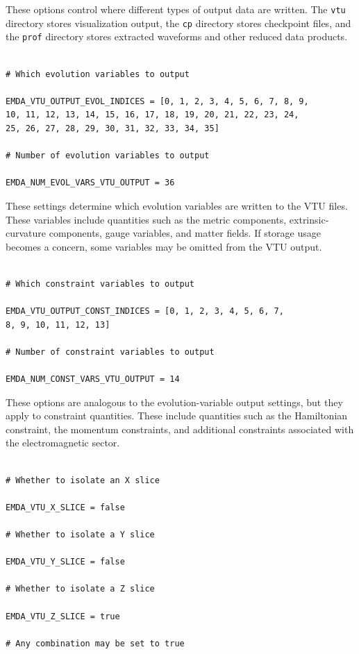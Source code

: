 These options control where different types of output data are written. The
\texttt{vtu} directory stores visualization output, the \texttt{cp} directory
stores checkpoint files, and the \texttt{prof} directory stores extracted
waveforms and other reduced data products.

\begin{verbatim}

# Which evolution variables to output

EMDA_VTU_OUTPUT_EVOL_INDICES = [0, 1, 2, 3, 4, 5, 6, 7, 8, 9,
10, 11, 12, 13, 14, 15, 16, 17, 18, 19, 20, 21, 22, 23, 24,
25, 26, 27, 28, 29, 30, 31, 32, 33, 34, 35]

# Number of evolution variables to output

EMDA_NUM_EVOL_VARS_VTU_OUTPUT = 36
\end{verbatim}

These settings determine which evolution variables are written to the VTU
files. These variables include quantities such as the metric components,
extrinsic-curvature components, gauge variables, and matter fields. If storage
usage becomes a concern, some variables may be omitted from the VTU output.

\begin{verbatim}

# Which constraint variables to output

EMDA_VTU_OUTPUT_CONST_INDICES = [0, 1, 2, 3, 4, 5, 6, 7,
8, 9, 10, 11, 12, 13]

# Number of constraint variables to output

EMDA_NUM_CONST_VARS_VTU_OUTPUT = 14
\end{verbatim}

These options are analogous to the evolution-variable output settings, but they
apply to constraint quantities. These include quantities such as the Hamiltonian
constraint, the momentum constraints, and additional constraints associated
with the electromagnetic sector.

\begin{verbatim}

# Whether to isolate an X slice

EMDA_VTU_X_SLICE = false

# Whether to isolate a Y slice

EMDA_VTU_Y_SLICE = false

# Whether to isolate a Z slice

EMDA_VTU_Z_SLICE = true

# Any combination may be set to true

\end{verbatim}

